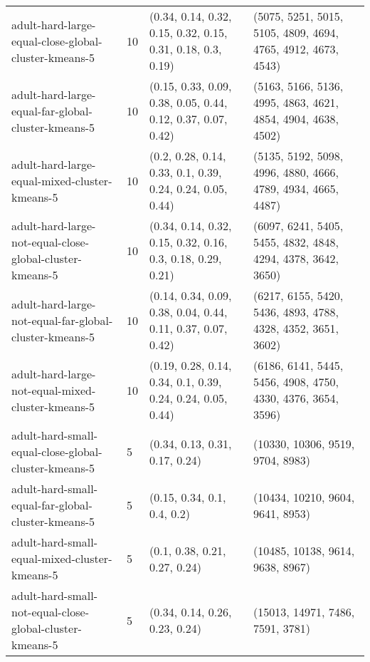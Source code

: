 \begin{longtable}{llll}
\bottomrule
\endlastfoot
                                   adult-hard-large-equal-close-global-cluster-kmeans-5 &             10 &  (0.34, 0.14, 0.32, 0.15, 0.32, 0.15, 0.31, 0.18, 0.3, 0.19) & (5075, 5251, 5015, 5105, 4809, 4694, 4765, 4912, 4673, 4543) \\
                                     adult-hard-large-equal-far-global-cluster-kmeans-5 &             10 & (0.15, 0.33, 0.09, 0.38, 0.05, 0.44, 0.12, 0.37, 0.07, 0.42) & (5163, 5166, 5136, 4995, 4863, 4621, 4854, 4904, 4638, 4502) \\
                                          adult-hard-large-equal-mixed-cluster-kmeans-5 &             10 &   (0.2, 0.28, 0.14, 0.33, 0.1, 0.39, 0.24, 0.24, 0.05, 0.44) & (5135, 5192, 5098, 4996, 4880, 4666, 4789, 4934, 4665, 4487) \\
                               adult-hard-large-not-equal-close-global-cluster-kmeans-5 &             10 &  (0.34, 0.14, 0.32, 0.15, 0.32, 0.16, 0.3, 0.18, 0.29, 0.21) & (6097, 6241, 5405, 5455, 4832, 4848, 4294, 4378, 3642, 3650) \\
                                 adult-hard-large-not-equal-far-global-cluster-kmeans-5 &             10 & (0.14, 0.34, 0.09, 0.38, 0.04, 0.44, 0.11, 0.37, 0.07, 0.42) & (6217, 6155, 5420, 5436, 4893, 4788, 4328, 4352, 3651, 3602) \\
                                      adult-hard-large-not-equal-mixed-cluster-kmeans-5 &             10 &  (0.19, 0.28, 0.14, 0.34, 0.1, 0.39, 0.24, 0.24, 0.05, 0.44) & (6186, 6141, 5445, 5456, 4908, 4750, 4330, 4376, 3654, 3596) \\
                                   adult-hard-small-equal-close-global-cluster-kmeans-5 &              5 &                               (0.34, 0.13, 0.31, 0.17, 0.24) &                             (10330, 10306, 9519, 9704, 8983) \\
                                     adult-hard-small-equal-far-global-cluster-kmeans-5 &              5 &                                  (0.15, 0.34, 0.1, 0.4, 0.2) &                             (10434, 10210, 9604, 9641, 8953) \\
                                          adult-hard-small-equal-mixed-cluster-kmeans-5 &              5 &                                (0.1, 0.38, 0.21, 0.27, 0.24) &                             (10485, 10138, 9614, 9638, 8967) \\
                               adult-hard-small-not-equal-close-global-cluster-kmeans-5 &              5 &                               (0.34, 0.14, 0.26, 0.23, 0.24) &                             (15013, 14971, 7486, 7591, 3781) \\

\end{longtable}
